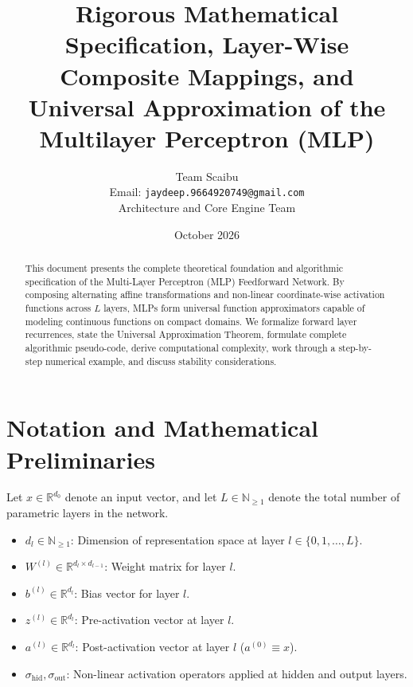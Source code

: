 \documentclass[11pt,a4paper]{article}
\title{\textbf{Rigorous Mathematical Specification, Layer-Wise Composite Mappings, and Universal Approximation of the Multilayer Perceptron (MLP)}}
\author{Team Scaibu \\ \small Email: \texttt{jaydeep.9664920749@gmail.com} \\ \small Architecture and Core Engine Team}
\date{October 2026}
\theoremstyle{definition}
\begin{document}
\maketitle

\begin{abstract}
This document presents the complete theoretical foundation and algorithmic specification of the Multi-Layer Perceptron (MLP) Feedforward Network. By composing alternating affine transformations and non-linear coordinate-wise activation functions across $L$ layers, MLPs form universal function approximators capable of modeling continuous functions on compact domains. We formalize forward layer recurrences, state the Universal Approximation Theorem, formulate complete algorithmic pseudo-code, derive computational complexity, work through a step-by-step numerical example, and discuss stability considerations.
\end{abstract}

\section{Notation and Mathematical Preliminaries}

Let $x \in \mathbb{R}^{d_0}$ denote an input vector, and let $L \in \mathbb{N}_{\ge 1}$ denote the total number of parametric layers in the network.

\begin{itemize}
    \item $d_l \in \mathbb{N}_{\ge 1}$: Dimension of representation space at layer $l \in \{0, 1, \dots, L\}$.
    \item $W^{(l)} \in \mathbb{R}^{d_l \times d_{l-1}}$: Weight matrix for layer $l$.
    \item $b^{(l)} \in \mathbb{R}^{d_l}$: Bias vector for layer $l$.
    \item $z^{(l)} \in \mathbb{R}^{d_l}$: Pre-activation vector at layer $l$.
    \item $a^{(l)} \in \mathbb{R}^{d_l}$: Post-activation vector at layer $l$ ($a^{(0)} \equiv x$).
    \item $\sigma_{\text{hid}}, \sigma_{\text{out}}$: Non-linear activation operators applied at hidden and output layers.
\end{itemize}
\end{document}
